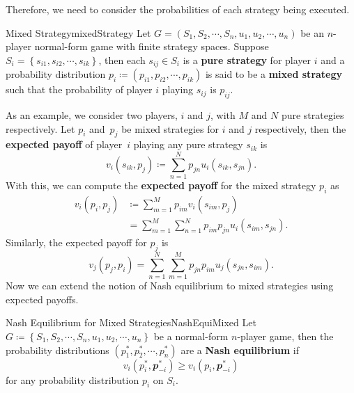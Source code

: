 \documentclass[math]{amznotes}
\theoremstyle{remark}
\begin{document}
Therefore, we need to consider the probabilities of each strategy being executed.
\begin{dfnbox}{Mixed Strategy}{mixedStrategy}
    Let $G = \left(S_1, S_2, \cdots, S_n, u_1, u_2, \cdots, u_n\right)$ be an $n$-player normal-form game with finite strategy spaces. Suppose $S_i = \left\{s_{i1}, s_{i2}, \cdots, s_{ik}\right\}$, then each $s_{ij} \in S_i$ is a {\color{red} \textbf{pure strategy}} for player $i$ and a probability distribution $p_i \coloneqq \left(p_{i1}, p_{i2}, \cdots, p_{ik}\right)$ is said to be a {\color{red} \textbf{mixed strategy}} such that the probability of player $i$ playing $s_{ij}$ is $p_{ij}$.
\end{dfnbox}
As an example, we consider two players, $i$ and $j$, with $M$ and $N$ pure strategies respectively. Let $p_i$ and~$p_j$ be mixed strategies for $i$ and $j$ respectively, then the \textbf{expected payoff} of player~$i$ playing any pure strategy $s_{ik}$ is 
\begin{equation*}
    v_i\left(s_{ik}, p_j\right) \coloneqq \sum_{n = 1}^{N}p_{jn}u_i\left(s_{ik}, s_{jn}\right).
\end{equation*}
With this, we can compute the \textbf{expected payoff} for the mixed strategy $p_i$ as 
\begin{align*}
    v_i\left(p_i, p_j\right) & \coloneqq \sum_{m = 1}^{M}p_{im}v_i\left(s_{im}, p_j\right) \\
    & = \sum_{m = 1}^{M}\sum_{n = 1}^{N}p_{im}p_{jn}u_i\left(s_{im}, s_{jn}\right).
\end{align*}
Similarly, the expected payoff for $p_j$ is 
\begin{equation*}
    v_j\left(p_j, p_i\right) = \sum_{n = 1}^{N}\sum_{m = 1}^{M}p_{jn}p_{im}u_j\left(s_{jn}, s_{im}\right).
\end{equation*}
Now we can extend the notion of Nash equilibrium to mixed strategies using expected payoffs.
\begin{dfnbox}{Nash Equilibrium for Mixed Strategies}{NashEquiMixed}
    Let $G \coloneqq \left\{S_1, S_2, \cdots, S_n, u_1, u_2, \cdots, u_n\right\}$ be a normal-form $n$-player game, then the probability distributions $\left(p_1^*, p_2^*, \cdots, p_n^*\right)$ are a {\color{red} \textbf{Nash equilibrium}} if 
    \begin{equation*}
        v_i\left(p_i^*, \mathbfit{p}_{-i}^*\right) \geq v_i\left(p_i, \mathbfit{p}_{-i}^*\right)
    \end{equation*}
    for any probability distribution $p_i$ on $S_i$.
\end{dfnbox}
\end{document}
